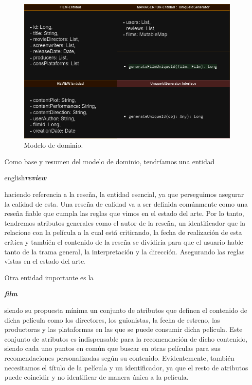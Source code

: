 \begin{figure}[h]
    \centering
    \includegraphics[width=\linewidth]{imagenes/Modelo_Dominio_Claqueta_TFG.drawio.png}
    \caption{Modelo de dominio.}
    \label{fig:diagrama}
\end{figure}



Como base y resumen del modelo de dominio, tendríamos una entidad \begin{otherlanguage}
{english}\textit{\textbf{review }}\end{otherlanguage}haciendo referencia a la reseña, la entidad 
esencial, ya que perseguimos asegurar la calidad de esta. Una reseña de calidad va a ser definida 
comúnmente como una reseña fiable que cumpla las reglas que vimos en el estado del arte. Por lo tanto, 
tendremos atributos generales como el autor de la reseña, un identificador que la relacione con la 
película a la cual está criticando, la fecha de realización de esta crítica y también el 
contenido de la reseña se dividiría para que el usuario hable tanto de la trama general, la 
interpretación y la dirección. Asegurando las reglas vistas en el estado del arte.

Otra entidad importante es la \begin{otherlanguage}{english}\textit{\textbf{film }}\end{otherlanguage} 
siendo su propuesta mínima un conjunto de atributos que definen el contenido de dicha película como los 
directores, los guionistas, la fecha de estreno, las productoras y las plataformas en las que se puede 
consumir dicha película. Este conjunto de atributos es indispensable para la recomendación de dicho 
contenido, siendo cada uno puntos en común que buscar en otras películas para sus recomendaciones 
personalizadas según su contenido. Evidentemente, también necesitamos el título de la película y un 
identificador, ya que el resto de atributos puede coincidir y no identificar de manera única a la 
película.

